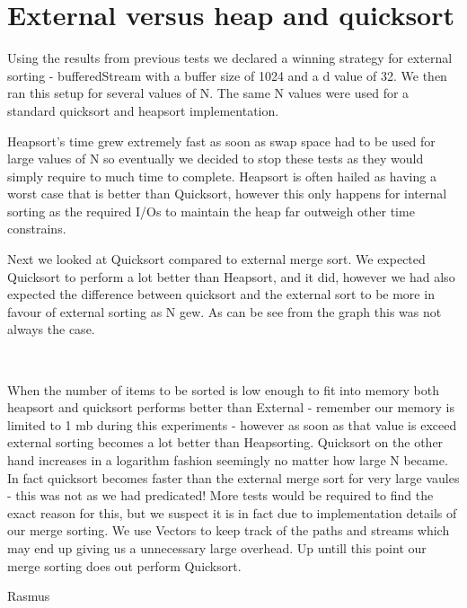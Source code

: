 \section{External versus heap and quicksort}

Using the results from previous tests we declared a winning strategy for external sorting - bufferedStream with a buffer size of 1024 and a d value of 32. We then ran this setup for several values of N. The same N values were used for a standard quicksort and heapsort implementation.

Heapsort's time grew extremely fast as soon as swap space had to be used for large values of N so eventually we decided to stop these tests as they would simply require to much time to complete. Heapsort is often hailed as having a worst case that is better than Quicksort, however this only happens for internal sorting as the required I/Os to maintain the heap far outweigh other time constrains.

Next we looked at Quicksort compared to external merge sort. We expected Quicksort to perform a lot better than Heapsort, and it did, however we had also expected the difference between quicksort and the external sort to be more in favour of external sorting as N gew. As can be see from the graph this was not always the case.

\includegraphics[width=0.5]{compare.png}

When the number of items to be sorted is low enough to fit into memory both heapsort and quicksort performs better than External - remember our memory is limited to 1 mb during this experiments - however as soon as that value is exceed external sorting becomes a lot better than Heapsorting. Quicksort on the other hand increases in a logarithm fashion seemingly no matter how large N became. In fact quicksort becomes faster than the external merge sort for very large vaules - this was not as we had predicated! More tests would be required to find the exact reason for this, but we suspect it is in fact due to implementation details of our merge sorting. We use Vectors to keep track of the paths and streams which may end up giving us a unnecessary large overhead. Up untill this point our merge sorting does out perform Quicksort.

Rasmus